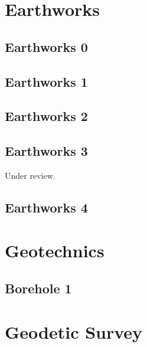 \documentclass{scrartcl}
\begin{document}
\section{Earthworks}
\label{sec:earthworks}

\subsection{Earthworks 0}
\label{sec:earth_0}
\clearpage

\subsection{Earthworks 1}
\label{sec:earth_1}
\clearpage

\subsection{Earthworks 2}
\label{sec:earth_2}
\clearpage

\subsection{Earthworks 3}
\label{sec:earth_3}
Under review.%
\clearpage

\subsection{Earthworks 4} %
\label{sec:earth_4}
\clearpage

\section{Geotechnics}
\label{sec:geotechnics}

\subsection{Borehole 1}
\label{sec:borehole_1}
\clearpage

\section{Geodetic Survey}
\label{sec:geodetic_survey}
\end{document}
